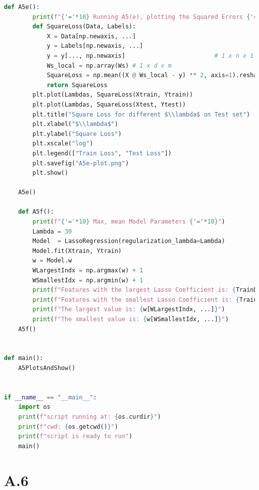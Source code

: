 \documentclass[]{article}
\begin{document}
\begin{lstlisting}[language=python]
    def A5e():
        print(f"{'='*10} Running A5(e), plotting the Squared Errors {'='*10}")
        def SquareLoss(Data, Labels):
            X = Data[np.newaxis, ...]
            y = Labels[np.newaxis, ...]
            y = y[..., np.newaxis]                         # 1 x n x 1
            Ws_local = np.array(Ws) # 1 x d x m
            SquareLoss = np.mean((X @ Ws_local - y) ** 2, axis=1).reshape(-1)
            return SquareLoss
        plt.plot(Lambdas, SquareLoss(Xtrain, Ytrain))
        plt.plot(Lambdas, SquareLoss(Xtest, Ytest))
        plt.title("Square Loss for different $\\lambda$ on Test set")
        plt.xlabel("$\\lambda$")
        plt.ylabel("Square Loss")
        plt.xscale("log")
        plt.legend(["Train Loss", "Test Loss"])
        plt.savefig("A5e-plot.png")
        plt.show()

    A5e()

    def A5f():
        print(f"{'='*10} Max, mean Model Parameters {'='*10}")
        Lambda = 30
        Model  = LassoRegression(regularization_lambda=Lambda)
        Model.fit(Xtrain, Ytrain)
        w = Model.w
        WLargestIndx = np.argmax(w) + 1
        WSmallestIdx = np.argmin(w) + 1
        print(f"Features with the largest Lasso Coefficient is: {TrainDf.columns[WLargestIndx]}")
        print(f"Features with the smallest Lasso Coefficient is: {TrainDf.columns[WSmallestIdx]}")
        print(f"The largest value is: {w[WLargestIndx, ...]}")
        print(f"The smallest value is: {w[WSmallestIdx, ...]}")
    A5f()


def main():
    A5PlotsAndShow()


if __name__ == "__main__":
    import os
    print(f"script running at: {os.curdir}")
    print(f"cwd: {os.getcwd()}")
    print(f"script is ready to run")
    main()
        \end{lstlisting}
            
\section*{A.6}
\end{document}
